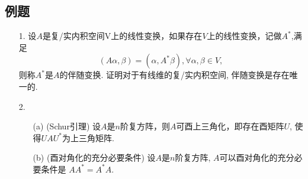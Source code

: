 \subsection{例题}
\begin{itemize}
    \item[1.] 设$A$是复/实内积空间V上的线性变换，如果存在$V$上的线性变换，记做$A^*$,满足
    $$(A\alpha, \beta) = (\alpha, A^* \beta), \forall \alpha, \beta \in V,$$
    则称$A^*$是$A$的伴随变换. 证明对于有线维的复/实内积空间, 伴随变换是存在唯一的.
    \vspace{5cm}

    \item[2.] 
    \begin{itemize}
        \item [(a)] (Schur引理) 设$A$是$n$阶复方阵，则$A$可酉上三角化，即存在酉矩阵$U$,
        使得$UAU^*$为上三角矩阵.
        \vspace{2cm}

        \item [(b)] (酉对角化的充分必要条件) 设$A$是$n$阶复方阵, $A$可以酉对角化的充分必要条件是
        $AA^* = A^*A$.
        \vspace{3cm}
    \end{itemize}
\end{itemize}